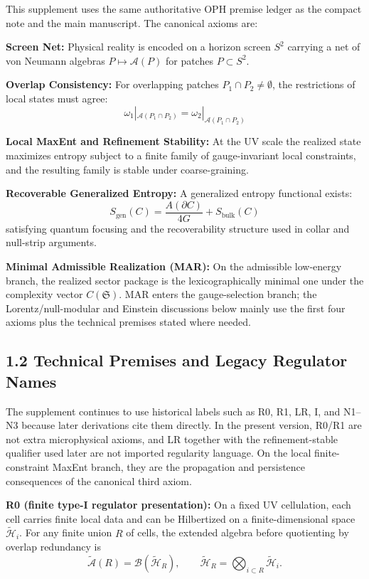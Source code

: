 This supplement uses the same authoritative OPH premise ledger as the compact note and the main manuscript. The canonical axioms are:

\textbf{Screen Net:} Physical reality is encoded on a horizon screen \(S^2\) carrying a net of von Neumann algebras \(P \mapsto \mathcal{A}(P)\) for patches \(P \subset S^2\).

\textbf{Overlap Consistency:} For overlapping patches \(P_1 \cap P_2 \neq \emptyset\), the restrictions of local states must agree: \[\omega_1|_{\mathcal{A}(P_1 \cap P_2)} = \omega_2|_{\mathcal{A}(P_1 \cap P_2)}\]

\textbf{Local MaxEnt and Refinement Stability:} At the UV scale the realized state maximizes entropy subject to a finite family of gauge-invariant local constraints, and the resulting family is stable under coarse-graining.

\textbf{Recoverable Generalized Entropy:} A generalized entropy functional exists: \[S_{\text{gen}}(C) = \frac{A(\partial C)}{4G} + S_{\text{bulk}}(C)\] satisfying quantum focusing and the recoverability structure used in collar and null-strip arguments.

\textbf{Minimal Admissible Realization (MAR):} On the admissible low-energy branch, the realized sector package is the lexicographically minimal one under the complexity vector \(C(\mathfrak S)\). MAR enters the gauge-selection branch; the Lorentz/null-modular and Einstein discussions below mainly use the first four axioms plus the technical premises stated where needed.

\subsection{1.2 Technical Premises and Legacy Regulator Names}\label{12-regulator-premises}

The supplement continues to use historical labels such as R0, R1, LR, I, and N1--N3 because later derivations cite them directly. In the present version, R0/R1 are not extra microphysical axioms, and LR together with the refinement-stable qualifier used later are not imported regularity language. On the local finite-constraint MaxEnt branch, they are the propagation and persistence consequences of the canonical third axiom.

\textbf{R0 (finite type-I regulator presentation):} On a fixed UV cellulation, each cell carries finite local data and can be Hilbertized on a finite-dimensional space \(\tilde{\mathcal H}_i\). For any finite union \(R\) of cells, the extended algebra before quotienting by overlap redundancy is
\[
\widetilde{\mathcal A}(R)=\mathcal B(\tilde{\mathcal H}_R),
\qquad
\tilde{\mathcal H}_R=\bigotimes_{i\subset R}\tilde{\mathcal H}_i.
\]

